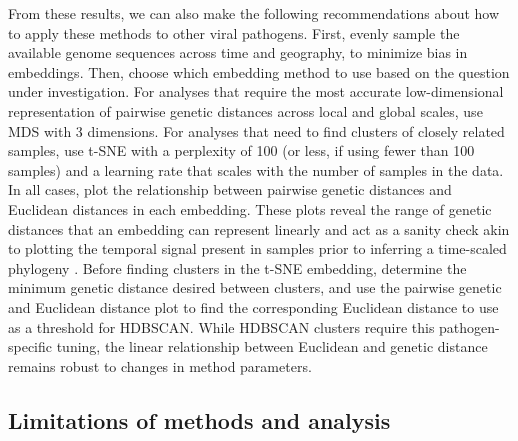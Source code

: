 \documentclass[10pt,letterpaper]{article}
\begin{document}
From these results, we can also make the following recommendations about how to apply these methods to other viral pathogens.
First, evenly sample the available genome sequences across time and geography, to minimize bias in embeddings.
Then, choose which embedding method to use based on the question under investigation.
For analyses that require the most accurate low-dimensional representation of pairwise genetic distances across local and global scales, use MDS with 3 dimensions.
For analyses that need to find clusters of closely related samples, use t-SNE with a perplexity of 100 (or less, if using fewer than 100 samples) and a learning rate that scales with the number of samples in the data.
In all cases, plot the relationship between pairwise genetic distances and Euclidean distances in each embedding.
These plots reveal the range of genetic distances that an embedding can represent linearly and act as a sanity check akin to plotting the temporal signal present in samples prior to inferring a time-scaled phylogeny \cite{Rambaut2016,Sagulenko2018}.
Before finding clusters in the t-SNE embedding, determine the minimum genetic distance desired between clusters, and use the pairwise genetic and Euclidean distance plot to find the corresponding Euclidean distance to use as a threshold for HDBSCAN.
While HDBSCAN clusters require this pathogen-specific tuning, the linear relationship between Euclidean and genetic distance remains robust to changes in method parameters.

\subsection*{Limitations of methods and analysis}
\end{document}
